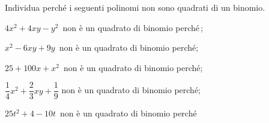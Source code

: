 
\begin{esercizio}
\label{ese:16.8}
Individua perché i seguenti polinomi non sono quadrati di un binomio.
\begin{enumeratea}
\item \(4x^{2}+4xy-y^{2}\)\, non è un quadrato di binomio perché\,\dotfill;
\item \(x^{2}-6xy+9y\)\, non è un quadrato di binomio perché\dotfill;
\item \(25+100x+x^{2}\)\, non è un quadrato di binomio perché\dotfill;
\item \(\dfrac{1}{4}x^{2}+\dfrac{2}{3}xy+\dfrac{1}{9}\) 
non è un quadrato di binomio perché\dotfill;
\item \(25t^{2}+4-10t\)\, non è un quadrato di binomio perché\dotfill%
\end{enumeratea}
\end{esercizio}

